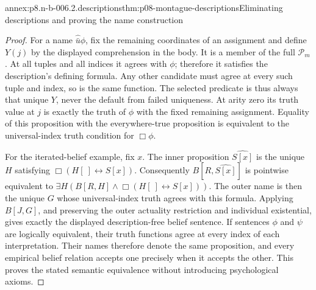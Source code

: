\begin{annexitem}{annex:p8.n-b-006.2.descriptions}{thm:p08-montague-descriptions}{Eliminating descriptions and proving the name construction}
\begin{proof}
For a name \(\widehat{\bar u}\phi\), fix the remaining coordinates
of an assignment and define \(Y(j)\) by the displayed comprehension
in the body. It is a member of the full \(\mathcal P_m\). At all
tuples and all indices it agrees with \(\phi\); therefore it satisfies
the description's defining formula. Any other candidate must agree at
every such tuple and index, so is the same function. The selected
predicate is thus always that unique \(Y\), never the default from
failed uniqueness. At arity zero its truth value at \(j\) is exactly
the truth of \(\phi\) with the fixed remaining assignment. Equality
of this proposition with the everywhere-true proposition is equivalent
to the universal-index truth condition for \(\Box\phi\).

For the iterated-belief example, fix \(x\). The inner proposition
\(\widehat{S[x]}\) is the unique \(H\) satisfying
\(\Box(H[\ ]\leftrightarrow S[x])\). Consequently
\(B[R,\widehat{S[x]}]\) is pointwise equivalent to
\(\exists H(B[R,H]\land\Box(H[\ ]\leftrightarrow S[x]))\).
The outer name is then the unique \(G\) whose universal-index truth
agrees with this formula. Applying \(B[J,G]\), and preserving the
outer actuality restriction and individual existential, gives exactly
the displayed description-free belief sentence. If sentences \(\phi\)
and \(\psi\) are logically equivalent, their truth functions agree
at every index of each interpretation. Their names therefore denote
the same proposition, and every empirical belief relation accepts
one precisely when it accepts the other. This proves the stated
semantic equivalence without introducing psychological axioms.
\end{proof}
\end{annexitem}

